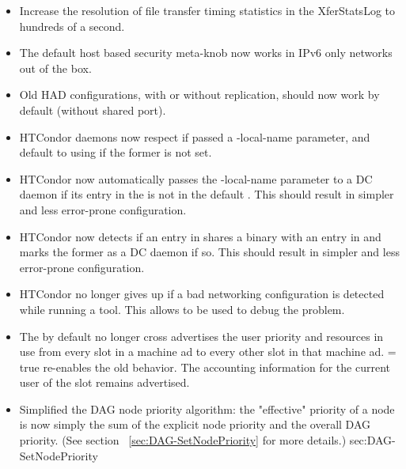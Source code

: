 \begin{itemize}

\item Increase the resolution of file transfer timing statistics in
the XferStatsLog to hundreds of a second.

\item The default host based security meta-knob now works in IPv6
only networks out of the box.

\item Old HAD configurations, with or without replication, should now work
by default (without shared port).

\item HTCondor daemons now respect 
if passed a -local-name parameter, and default to using
 if the former is not set.

\item HTCondor now automatically passes the -local-name parameter to a
DC daemon if its entry in the  is not in the default
.  This should result in simpler and less
error-prone configuration.

\item HTCondor now detects if an entry in  shares a
binary with an entry in  and marks the former as
a DC daemon if so.  This should result in simpler and less error-prone
configuration.

\item HTCondor no longer gives up if a bad networking configuration is
detected while running a tool.  This allows  to be
used to debug the problem.

\item The  by default no longer cross advertises the
user priority and resources in use from every slot in a machine ad to every
other slot in that machine ad.   = true
re-enables the old behavior.  The accounting information for the current
user of the slot remains advertised.

\item Simplified the DAG node priority algorithm:  the "effective" priority
of a node is now simply the sum of the explicit node priority and the
overall DAG priority.  (See section ~\ref{sec:DAG-SetNodePriority} for
more details.)
sec:DAG-SetNodePriority


\end{itemize}
